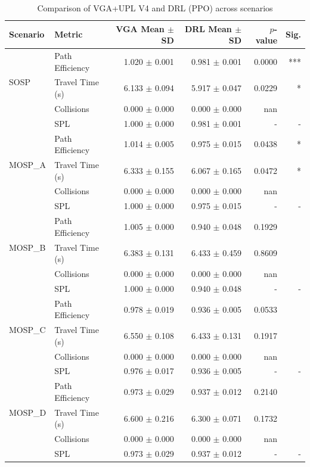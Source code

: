 \begin{table}[htbp]
\centering
\caption{Comparison of VGA+UPL V4 and DRL (PPO) across scenarios}
\label{tab:comparison}
\begin{tabular}{llrrrr}
\toprule
Scenario & Metric & VGA Mean $\pm$ SD & DRL Mean $\pm$ SD & $p$-value & Sig. \\
\midrule
\multirow{3}{*}{SOSP} 
 & 
Path Efficiency & 1.020 $\pm$ 0.001 & 0.981 $\pm$ 0.001 & 0.0000 & *** \\
 & 
Travel Time (s) & 6.133 $\pm$ 0.094 & 5.917 $\pm$ 0.047 & 0.0229 & * \\
 & 
Collisions & 0.000 $\pm$ 0.000 & 0.000 $\pm$ 0.000 & nan &  \\
 & SPL & 1.000 $\pm$ 0.000 & 0.981 $\pm$ 0.001 & - & - \\
\midrule
\multirow{3}{*}{MOSP_A} 
 & 
Path Efficiency & 1.014 $\pm$ 0.005 & 0.975 $\pm$ 0.015 & 0.0438 & * \\
 & 
Travel Time (s) & 6.333 $\pm$ 0.155 & 6.067 $\pm$ 0.165 & 0.0472 & * \\
 & 
Collisions & 0.000 $\pm$ 0.000 & 0.000 $\pm$ 0.000 & nan &  \\
 & SPL & 1.000 $\pm$ 0.000 & 0.975 $\pm$ 0.015 & - & - \\
\midrule
\multirow{3}{*}{MOSP_B} 
 & 
Path Efficiency & 1.005 $\pm$ 0.000 & 0.940 $\pm$ 0.048 & 0.1929 &  \\
 & 
Travel Time (s) & 6.383 $\pm$ 0.131 & 6.433 $\pm$ 0.459 & 0.8609 &  \\
 & 
Collisions & 0.000 $\pm$ 0.000 & 0.000 $\pm$ 0.000 & nan &  \\
 & SPL & 1.000 $\pm$ 0.000 & 0.940 $\pm$ 0.048 & - & - \\
\midrule
\multirow{3}{*}{MOSP_C} 
 & 
Path Efficiency & 0.978 $\pm$ 0.019 & 0.936 $\pm$ 0.005 & 0.0533 &  \\
 & 
Travel Time (s) & 6.550 $\pm$ 0.108 & 6.433 $\pm$ 0.131 & 0.1917 &  \\
 & 
Collisions & 0.000 $\pm$ 0.000 & 0.000 $\pm$ 0.000 & nan &  \\
 & SPL & 0.976 $\pm$ 0.017 & 0.936 $\pm$ 0.005 & - & - \\
\midrule
\multirow{3}{*}{MOSP_D} 
 & 
Path Efficiency & 0.973 $\pm$ 0.029 & 0.937 $\pm$ 0.012 & 0.2140 &  \\
 & 
Travel Time (s) & 6.600 $\pm$ 0.216 & 6.300 $\pm$ 0.071 & 0.1732 &  \\
 & 
Collisions & 0.000 $\pm$ 0.000 & 0.000 $\pm$ 0.000 & nan &  \\
 & SPL & 0.973 $\pm$ 0.029 & 0.937 $\pm$ 0.012 & - & - \\
\midrule
\bottomrule
\end{tabular}
\end{table}